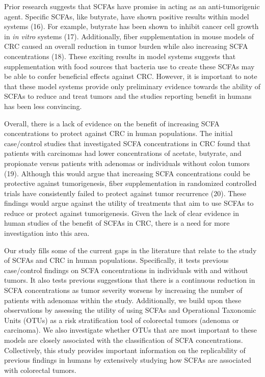 \documentclass[11pt,]{article}
\begin{document}
Prior research suggests that SCFAs have promise in acting as an
anti-tumorigenic agent. Specific SCFAs, like butyrate, have shown
positive results within model systems (16). For example, butyrate has
been shown to inhibit cancer cell growth in \emph{in vitro} systems
(17). Additionally, fiber supplementation in mouse models of CRC caused
an overall reduction in tumor burden while also increasing SCFA
concentrations (18). These exciting results in model systems suggests
that supplementation with food sources that bacteria use to create these
SCFAs may be able to confer beneficial effects against CRC. However, it
is important to note that these model systems provide only preliminary
evidence towards the ability of SCFAs to reduce and treat tumors and the
studies reporting benefit in humans has been less convincing.

Overall, there is a lack of evidence on the benefit of increasing SCFA
concentrations to protect against CRC in human populations. The initial
case/control studies that investigated SCFA concentrations in CRC found
that patients with carcinomas had lower concentrations of acetate,
butyrate, and propionate versus patients with adenomas or individuals
without colon tumors (19). Although this would argue that increasing
SCFA concentrations could be protective against tumorigenesis, fiber
supplementation in randomized controlled trials have consistently failed
to protect against tumor recurrence (20). These findings would argue
against the utility of treatments that aim to use SCFAs to reduce or
protect against tumorigenesis. Given the lack of clear evidence in human
studies of the benefit of SCFAs in CRC, there is a need for more
investigation into this area.

Our study fills some of the current gaps in the literature that relate
to the study of SCFAs and CRC in human populations. Specifically, it
tests previous case/control findings on SCFA concentrations in
individuals with and without tumors. It also tests previous suggestions
that there is a continuous reduction in SCFA concentrations as tumor
severity worsens by increasing the number of patients with adenomas
within the study. Additionally, we build upon these observations by
assessing the utility of using SCFAs and Operational Taxonomic Units
(OTUs) as a risk stratification tool of colorectal tumors (adenoma or
carcinoma). We also investigate whether OTUs that are most important to
these models are closely associated with the classification of SCFA
concentrations. Collectively, this study provides important information
on the replicability of previous findings in humans by extensively
studying how SCFAs are associated with colorectal tumors.
\end{document}
